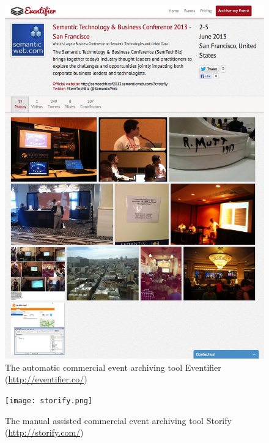 \begin{figure}
  \centering
  \includegraphics[width=\linewidth]{eventifier.png}
  \caption{The automatic commercial event archiving tool Eventifier
    (\url{http://eventifier.co/})}
  \label{fig:eventifier}
\end{figure}

\begin{figure}
  \centering
  \texttt{[image: storify.png]}
  \caption{The manual assisted commercial event archiving tool Storify
    (\url{http://storify.com/})}
  \label{fig:storify}
\end{figure}

